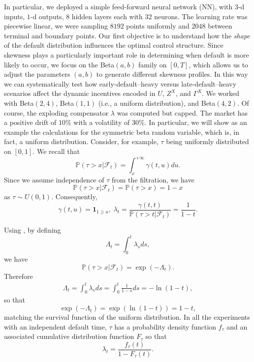 \documentclass[11pt,a4paper]{article}
\theoremstyle{thmstyleone}%
\theoremstyle{thmstyletwo}%
\theoremstyle{thmstylethree}%
\newcommand{\ind}{\mathbf{1}}
\begin{document}
In particular, we deployed a simple feed-forward neural network (NN), with $3$-d inputs, $1$-d outputs, $8$ hidden layers each with $32$ neurons. The learning rate was piecewise linear, we were sampling $8192$ points uniformly and $2048$ between terminal and boundary points. Our first objective is to understand how the \emph{shape} of the default distribution influences the optimal control structure. Since skewness plays a particularly important role in determining when default is more likely to occur, we focus on the Beta$(a,b)$ family on $[0,T]$, which allows us to adjust the parameters $(a,b)$ to generate different skewness profiles. In this way we can systematically test how early-default–heavy versus late-default–heavy scenarios affect the dynamic incentives encoded in $U$, $Z^X$, and $\Gamma^X$. We worked with Beta$(2, 4)$, Beta$(1, 1)$ (i.e., a uniform distribution), and Beta$(4, 2)$. Of course, the exploding compensator $\lambda$ was computed but capped. The market has a positive drift of $10\%$ with a volatility of $30\%$. In particular, we will show as an example the calculations for the symmetric beta random variable, which is, in fact, a uniform distribution. Consider, for example, $\tau$ being uniformly distributed on $[0,1]$. We recall that
\[
    \mathbb P(\tau > x | \mathcal{F}_t)= \int_x^{+\infty} \gamma(t, u) du.
\]
Since we assume independence of $\tau$ from the filtration, we have \[\mathbb P(\tau > x | \mathcal{F}_t) = \mathbb P(\tau > x) = 1-x\]
as $\tau \sim U(0,1)$. Consequently, 
\[
    \gamma(t, u) =  \ind_{1 \geq u},\; \lambda_t = \frac{\gamma(t, t)}{\mathbb P(\tau > t | \mathcal{F}_t)} = \frac{1}{1-t}.
\]

Using \cite[Proposition 4.4]{el2010happens}, by defining
\[
    \Lambda_t = \int_0^t \lambda_s ds,
\]
we have 
\[
    \mathbb P(\tau > x | \mathcal{F}_t) = \exp{(-\Lambda_t)}.
\]
Therefore
\begin{align*}
    \Lambda_t = \int_0^t \lambda_s ds = \int_0^t \frac{1}{1-s}ds= -\ln{(1-t)},
\end{align*}
so that
\[
    \exp{(-\Lambda_t)} = \exp{(\ln{(1-t)})} = 1 -t,
\] matching the survival function of the uniform distribution. 
In all the experiments with an independent default time, $\tau$ has a probability density function $f_{\tau}$ and an associated cumulative distribution function $F_{\tau}$ so that
\[
    \lambda_t = \frac{f_{\tau}(t)}{1 - F_{\tau}(t)}.
\]
\end{document}
